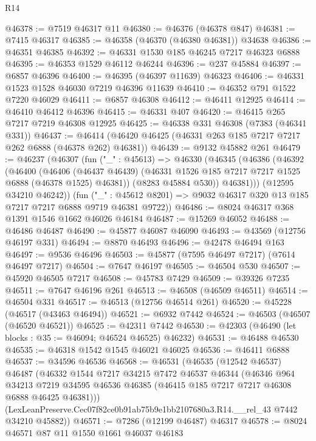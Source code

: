 \begin{lexlean}{R14}
\begin{coremodule}
@46378 := @7519 @46317 @11
@46380 := @46376 (@46378 @847)
@46381 := @7415 @46317
@46385 := @46358 (@46370 (@46380 @46381)) @34638
@46386 := @46351 @46385
@46392 := @46331 @1530 @185 @46245 @7217 @46323 @6888
@46395 := @46353 @1529 @46112 @46244
@46396 := @237 @45884
@46397 := @6857 @46396
@46400 := @46395 (@46397 @11639) @46323
@46406 := @46331 @1523 @1528 @46030 @7219 @46396 @11639
@46410 := @46352 @791 @1522 @7220 @46029
@46411 := @6857 @46308
@46412 := @46411 @12925
@46414 := @46410 @46412 @46396
@46415 := @46331 @407
@46420 := @46415 @265 @7217 @7219 @46308 @12925
@46425 := @46338 @331 @46308 (@7383 (@46341 @331))
@46437 := @46414 (@46420 @46425 (@46331 @263 @185 @7217 @7217 @262 @6888 (@46378 @262) @46381))
@46439 := @9132 @45882 @261
@46479 := @46237
    (@46307
      (fun ("_" : @45613) =>
      @46330
        (@46345
          (@46386
            (@46392
              (@46400
                (@46406
                  (@46437 @46439)
                  (@46331 @1526 @185 @7217 @7217 @1525 @6888 (@46378 @1525) @46381))
                (@8283 @45884 @530))
              @46381)))
        (@12595 @34210 @46242))
      (fun ("_" : @45612 @8201) => @9032 @46317 @320 @13 @185 @7217 @7217 @6888 @9719 @46381 @9722))
@46486 := @8024 @46317 @368 @1391 @1546 @1662 @46026 @46184
@46487 := @15269 @46052
@46488 := @46486 @46487
@46490 := @45877 @46087 @46090
@46493 := @43569 (@12756 @46197 @331)
@46494 := @8870 @46493
@46496 := @42478 @46494 @163
@46497 := @9536 @46496
@46503 := @45877 (@7595 @46497 @7217) (@7614 @46497 @7217)
@46504 := @7647 @46197
@46505 := @46504 @530
@46507 := @45920 @46505 @7217
@46508 := @45783 @7429
@46509 := @39326 @7235
@46511 := @7647 @46196 @261
@46513 := @46508 (@46509 @46511)
@46514 := @46504 @331
@46517 := @46513 (@12756 @46514 @261)
@46520 := @45228 (@46517 (@43463 @46494))
@46521 := @6932 @7442
@46524 := @46503 (@46507 (@46520 @46521))
@46525 := @42311 @7442
@46530 := @42303 (@46490 (let blocks : @35 := @46094; @46524 @46525) @46232)
@46531 := @46488 @46530
@46535 := @46318 @1542 @1545 @46021 @46025
@46536 := @46411 @6888
@46537 := @34596 @46536
@46568 := @46531
    (@46535
      (@12542 @46537)
      @46487
      (@46332
        @1544
        @7217
        @34215
        @7472
        @46537
        @46344
        (@46346
          @964
          @34213
          @7219
          @34595
          @46536
          @46385
          (@46415 @185 @7217 @7217 @46308 @6888 @46425 @46381)))
      (LexLeanPreserve.Cec07f82ce0b91ab75b9e1bb2107680a3.R14.__rel_43 @7442 @34210 @45882))
@46571 := @7286 (@12199 @46487) @46317
@46578 := @8024 @46571 @87 @11 @1550 @1661 @46037 @46183

\end{coremodule}
\end{lexlean}
